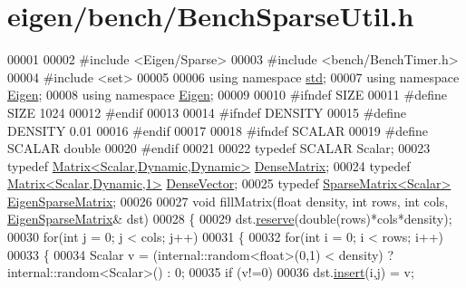 \hypertarget{eigen_2bench_2_bench_sparse_util_8h_source}{}\section{eigen/bench/\+Bench\+Sparse\+Util.h}
\label{eigen_2bench_2_bench_sparse_util_8h_source}

\begin{DoxyCode}
00001 
00002 \textcolor{preprocessor}{#include <Eigen/Sparse>}
00003 \textcolor{preprocessor}{#include <bench/BenchTimer.h>}
00004 \textcolor{preprocessor}{#include <set>}
00005 
00006 \textcolor{keyword}{using namespace }\hyperlink{namespacestd}{std};
00007 \textcolor{keyword}{using namespace }\hyperlink{namespace_eigen}{Eigen};
00008 \textcolor{keyword}{using namespace }\hyperlink{namespace_eigen}{Eigen};
00009 
00010 \textcolor{preprocessor}{#ifndef SIZE}
00011 \textcolor{preprocessor}{#define SIZE 1024}
00012 \textcolor{preprocessor}{#endif}
00013 
00014 \textcolor{preprocessor}{#ifndef DENSITY}
00015 \textcolor{preprocessor}{#define DENSITY 0.01}
00016 \textcolor{preprocessor}{#endif}
00017 
00018 \textcolor{preprocessor}{#ifndef SCALAR}
00019 \textcolor{preprocessor}{#define SCALAR double}
00020 \textcolor{preprocessor}{#endif}
00021 
00022 \textcolor{keyword}{typedef} SCALAR Scalar;
00023 \textcolor{keyword}{typedef} \hyperlink{group___core___module}{Matrix<Scalar,Dynamic,Dynamic>} \hyperlink{group___core___module_class_eigen_1_1_matrix}{DenseMatrix};
00024 \textcolor{keyword}{typedef} \hyperlink{group___core___module}{Matrix<Scalar,Dynamic,1>} \hyperlink{group___core___module}{DenseVector};
00025 \textcolor{keyword}{typedef} \hyperlink{group___sparse_core___module}{SparseMatrix<Scalar>} \hyperlink{group___sparse_core___module}{EigenSparseMatrix};
00026 
00027 \textcolor{keywordtype}{void} fillMatrix(\textcolor{keywordtype}{float} density, \textcolor{keywordtype}{int} rows, \textcolor{keywordtype}{int} cols,  \hyperlink{group___sparse_core___module}{EigenSparseMatrix}& dst)
00028 \{
00029   dst.\hyperlink{group___sparse_core___module_a1518e58ac49bed0e2385b722a034f7d3}{reserve}(\textcolor{keywordtype}{double}(rows)*cols*density);
00030   \textcolor{keywordflow}{for}(\textcolor{keywordtype}{int} j = 0; j < cols; j++)
00031   \{
00032     \textcolor{keywordflow}{for}(\textcolor{keywordtype}{int} i = 0; i < rows; i++)
00033     \{
00034       Scalar v = (internal::random<float>(0,1) < density) ? internal::random<Scalar>() : 0;
00035       \textcolor{keywordflow}{if} (v!=0)
00036         dst.\hyperlink{group___sparse_core___module_aae45e3b5fec7f6a0cdd10eec7c6d3666}{insert}(i,j) = v;

\end{DoxyCode}
